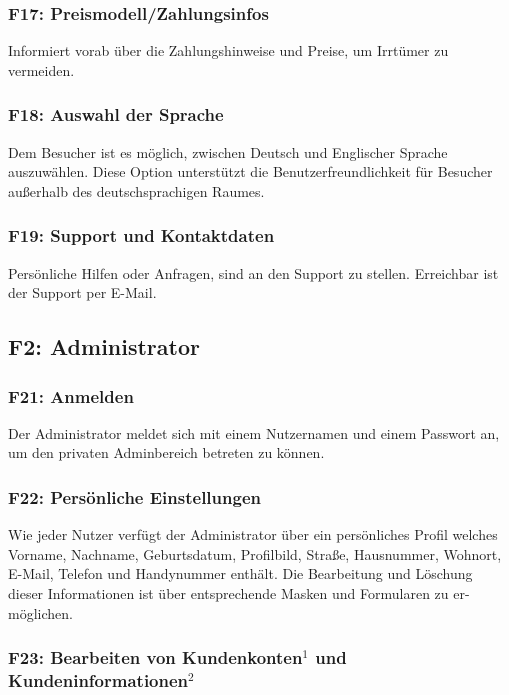 \documentclass[10pt,a4paper]{scrartcl}
\begin{document}
\subsubsection*{F17: Preismodell/Zahlungsinfos}

Informiert vorab über die Zahlungshinweise und Preise, um Irrtümer zu vermeiden.

\subsubsection*{F18: Auswahl der Sprache}

Dem Besucher ist es möglich, zwischen Deutsch und Englischer Sprache auszuwählen. Diese Option unterstützt die Benutzerfreundlichkeit für Besucher außerhalb des deutschsprachigen Raumes. 

\subsubsection*{F19: Support und Kontaktdaten}

Persönliche Hilfen oder Anfragen, sind an den Support zu stellen. Erreichbar ist der Support per E-Mail. 


\subsection{F2: Administrator}

\subsubsection*{F21: Anmelden}

Der Administrator meldet sich mit einem Nutzernamen und einem Passwort an, um den privaten Adminbereich betreten zu können.
	
\subsubsection*{F22: Persönliche Einstellungen}

Wie jeder Nutzer verfügt der Administrator über ein persönliches Profil welches Vorname, Nachname, Geburtsdatum, Profilbild, Straße, Hausnummer, Wohnort, E-Mail, Telefon und Handynummer enthält. Die Bearbeitung und Löschung dieser Informationen ist über entsprechende Masken und Formularen zu er-möglichen.

\subsubsection*{F23: Bearbeiten von Kundenkonten$^1$ und Kundeninformationen$^2$}
\end{document}
